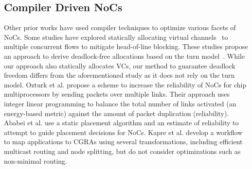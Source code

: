 \subsection{Compiler Driven NoCs}
Other prior works have used compiler techniques to optimize various facets of NoCs.
Some studies have explored statically allocating virtual channels~\cite{staticVC-isca, staticVC-nocs} to multiple concurrent flows to mitigate head-of-line blocking. These studies propose an approach to derive deadlock-free allocations based on the turn model~\cite{turnModel}. While our approach also statically allocates VCs, our method to guarantee deadlock freedom differs from the aforementioned study as it does not rely on the turn model.
Ozturk et al. \cite{ozturk2010compiler} propose a scheme to increase the reliability of NoCs for chip multiprocessors by sending packets over multiple links.
Their approach uses integer linear programming to balance the total number of links activated (an energy-based metric) against the amount of packet duplication (reliability).
Ababei et al. \cite{ababei2011energy} use a static placement algorithm and an estimate of reliability to attempt to guide placement decisions for NoCs.
Kapre et al. \cite{kapre2011noc} develop a workflow to map applications to CGRAs using several transformations, including efficient multicast routing and node splitting, but do not consider optimizations such as non-minimal routing.






